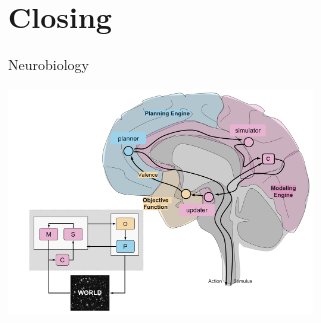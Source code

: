 \section{Closing}






 



\begin{frame}[label=ladila]{Neurobiology}
 \begin{center}
  \includegraphics[height=6cm]{img/agent_neuro.png}
  \end{center}

\end{frame}

